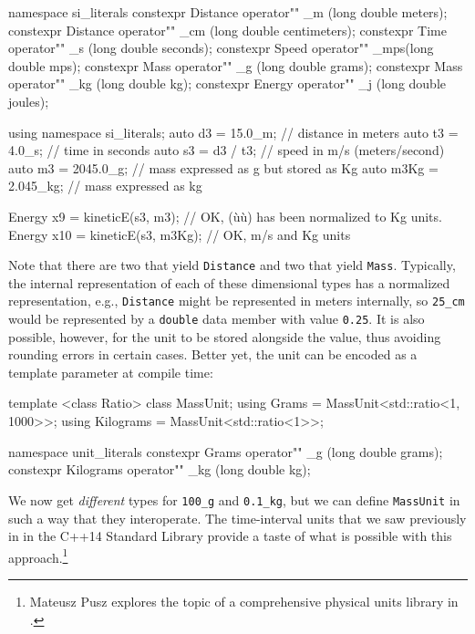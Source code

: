 \begin{emcppslisting}
namespace si_literals
{
    constexpr Distance operator"" _m  (long double meters);
    constexpr Distance operator"" _cm (long double centimeters);
    constexpr Time     operator"" _s  (long double seconds);
    constexpr Speed    operator"" _mps(long double mps);
    constexpr Mass     operator"" _g  (long double grams);
    constexpr Mass     operator"" _kg (long double kg);
    constexpr Energy   operator"" _j  (long double joules);
}

using namespace si_literals;
auto d3   = 15.0_m;    // distance in meters
auto t3   = 4.0_s;     // time in seconds
auto s3   = d3 / t3;   // speed in m/s (meters/second)
auto m3   = 2045.0_g;  // mass expressed as g but stored as Kg
auto m3Kg = 2.045_kg;  // mass expressed as kg

Energy x9  = kineticE(s3, m3);    // OK, (ù{}ù) has been normalized to Kg units.
Energy x10 = kineticE(s3, m3Kg);  // OK, m/s and Kg units
\end{emcppslisting}
    
\noindent Note that there are two  that yield \lstinline!Distance! and
two  that yield \lstinline!Mass!. Typically, the internal
representation of each of these dimensional types has a normalized
representation, e.g., \lstinline!Distance! might be represented in meters
internally, so \lstinline!25_cm! would be represented by a \lstinline!double!
data member with value \lstinline!0.25!. It is also possible, however, for
the unit to be stored alongside the value, thus avoiding rounding errors
in certain cases. Better yet, the unit can be encoded as a template
parameter at compile time:

\begin{emcppslisting}
template <class Ratio> class MassUnit;
using Grams     = MassUnit<std::ratio<1, 1000>>;
using Kilograms = MassUnit<std::ratio<1>>;

namespace unit_literals
{
    constexpr Grams     operator"" _g  (long double grams);
    constexpr Kilograms operator"" _kg (long double kg);
}
\end{emcppslisting}
    
\noindent We now get \emph{different} types for \lstinline!100_g! and
\lstinline!0.1_kg!, but we can define \lstinline!MassUnit! in such a way that
they interoperate. The time-interval units that we saw previously in
{ in the C++14 Standard Library} provide a taste of what is
possible with this approach.{\cprotect\footnote{Mateusz Pusz explores
the topic of a comprehensive physical units library in \cite{pusz20b}.}}

